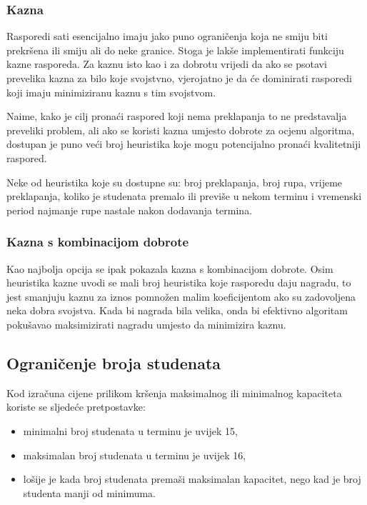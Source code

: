 \documentclass[times, utf8, zavrsni]{fer}
\begin{document}
\subsubsection{Kazna}

Rasporedi sati esencijalno imaju jako puno ograničenja koja ne smiju biti prekršena ili smiju ali do neke granice. Stoga je lakše implementirati funkciju kazne rasporeda. Za kaznu isto kao i za dobrotu vrijedi da ako se psotavi prevelika kazna za bilo koje svojstvno, vjerojatno je da će dominirati rasporedi koji imaju minimiziranu kaznu s tim svojstvom.

Naime, kako je cilj pronaći raspored koji nema preklapanja to ne predstavalja preveliki problem, ali ako se koristi kazna umjesto dobrote za ocjenu algoritma, dostupan je puno veći broj heuristika koje mogu potencijalno pronaći kvalitetniji raspored.

Neke od heuristika koje su dostupne su: broj preklapanja, broj rupa, vrijeme preklapanja, koliko je studenata premalo ili previše u nekom terminu i vremenski period najmanje rupe nastale nakon dodavanja termina.

\subsubsection{Kazna s kombinacijom dobrote}
\label{sec:kombinacija}

Kao najbolja opcija se ipak pokazala kazna s kombinacijom dobrote. Osim heuristika kazne uvodi se mali broj heuristika koje rasporedu daju nagradu, to jest smanjuju kaznu za iznos pomnožen malim koeficijentom ako su zadovoljena neka dobra svojstva. Kada bi nagrada bila velika, onda bi efektivno algoritam pokušavao maksimizirati nagradu umjesto da minimizira kaznu.

\subsection{Ograničenje broja studenata}

Kod izračuna cijene prilikom kršenja maksimalnog ili minimalnog kapaciteta koriste se sljedeće pretpostavke:

\begin{itemize}
	\item minimalni broj studenata u terminu je uvijek 15,
	\item maksimalan broj studenata u terminu je uvijek 16,
	\item lošije je kada broj studenata premaši maksimalan kapacitet, nego kad je broj studenta manji od minimuma.
\end{itemize}
\end{document}
